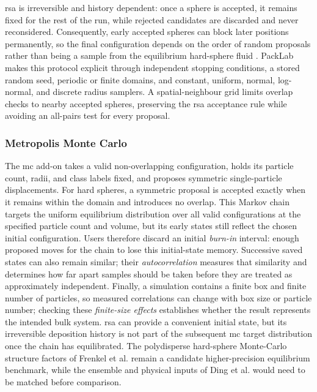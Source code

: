 \documentclass[11pt]{article}
\begin{document}
\gls{rsa} is irreversible and history dependent: once a sphere is accepted, it remains fixed for the rest of the run, while rejected candidates are discarded and never reconsidered. %
Consequently, early accepted spheres can block later positions permanently, so the final configuration depends on the order of random proposals rather than being a sample from the equilibrium hard-sphere fluid \cite{Feder1980}. %
PackLab makes this protocol explicit through independent stopping conditions, a stored random seed, periodic or finite domains, and constant, uniform, normal, log-normal, and discrete radius samplers. %
A spatial-neighbour grid limits overlap checks to nearby accepted spheres, preserving the \gls{rsa} acceptance rule while avoiding an all-pairs test for every proposal. %

\subsubsection{Metropolis Monte Carlo}

The \gls{mc} add-on takes a valid non-overlapping configuration, holds its particle count, radii, and class labels fixed, and proposes symmetric single-particle displacements. %
For hard spheres, a symmetric proposal is accepted exactly when it remains within the domain and introduces no overlap. %
This Markov chain targets the uniform equilibrium distribution over all valid configurations at the specified particle count and volume, but its early states still reflect the chosen initial configuration. %
Users therefore discard an initial \emph{burn-in} interval: enough proposed moves for the chain to lose this initial-state memory. %
Successive saved states can also remain similar; their \emph{autocorrelation} measures that similarity and determines how far apart samples should be taken before they are treated as approximately independent. %
Finally, a simulation contains a finite box and finite number of particles, so measured correlations can change with box size or particle number; checking these \emph{finite-size effects} establishes whether the result represents the intended bulk system. %
\gls{rsa} can provide a convenient initial state, but its irreversible deposition history is not part of the subsequent \gls{mc} target distribution once the chain has equilibrated. %
The polydisperse hard-sphere Monte-Carlo structure factors of Frenkel et al. \cite{Frenkel1986} remain a candidate higher-precision equilibrium benchmark, while the ensemble and physical inputs of Ding et al. \cite{Ding1992} would need to be matched before comparison. %
\end{document}
